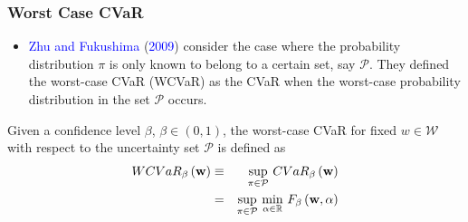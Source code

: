 \documentclass[pdf,10pt,xcolor=dvipsnames,hide notes]{beamer}
\begin{document}
\begin{frame}[label=frame2d]
	\frametitle{Worst Case CVaR}
	
	\begin{itemize}
		\justifying
		\setlength{\parskip}{15pt}

\item %
\textcolor{blue}{Zhu and Fukushima} (\textcolor{blue}{2009}) consider the case where the probability distribution $\pi$ is only known to belong to a certain set, say $\mathcal{P}$. They defined the worst-case CVaR (WCVaR) as the CVaR when the worst-case probability distribution in the set $\mathcal{P}$ occurs.

\end{itemize}

\begin{definition}
	Given a confidence level $\beta$, $\beta \in (0,1)$, the worst-case CVaR
	for fixed $w\in \mathcal{W}$ with respect to the uncertainty set $\mathcal{P}	$ is defined as
	\begin{eqnarray}
	WCVaR_{\beta }\left( \mathbf{w}\right) &\equiv &\underset{\pi \in \mathcal{P}%
	}{\sup }~ CVaR_{\beta }\left( \mathbf{w}\right)  \notag \\
	&=&\underset{\pi \in \mathcal{P}}{\sup }~\underset{\alpha \in
		\mathbb{R}
	}{\min }~F_{\beta }\left(\mathbf{w},\alpha \right)  \label{14}
	\end{eqnarray}
\end{definition}

\end{frame}
\end{document}
